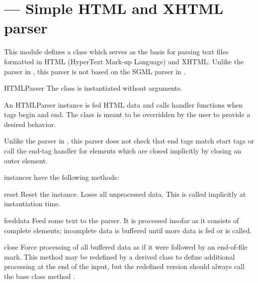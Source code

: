 \section{ ---
         Simple HTML and XHTML parser}


This module defines a class  which serves as the
basis for parsing text files formatted in HTML (HyperText
Mark-up Language) and XHTML.  Unlike the parser in
, this parser is not based on the SGML parser in
.


\begin{classdesc}{HTMLParser}{}
The  class is instantiated without arguments.

An HTMLParser instance is fed HTML data and calls handler functions
when tags begin and end.  The  class is meant to be
overridden by the user to provide a desired behavior.

Unlike the parser in , this parser does not check
that end tags match start tags or call the end-tag handler for
elements which are closed implicitly by closing an outer element.
\end{classdesc}


 instances have the following methods:

\begin{methoddesc}{reset}{}
Reset the instance.  Loses all unprocessed data.  This is called
implicitly at instantiation time.
\end{methoddesc}

\begin{methoddesc}{feed}{data}
Feed some text to the parser.  It is processed insofar as it consists
of complete elements; incomplete data is buffered until more data is
fed or  is called.
\end{methoddesc}

\begin{methoddesc}{close}{}
Force processing of all buffered data as if it were followed by an
end-of-file mark.  This method may be redefined by a derived class to
define additional processing at the end of the input, but the
redefined version should always call the  base class
method .
\end{methoddesc}

